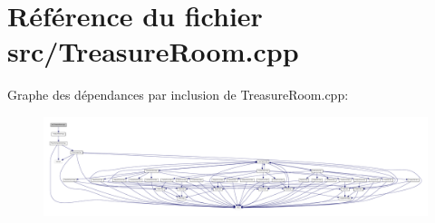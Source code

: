 \section{Référence du fichier src/\-Treasure\-Room.cpp}
\label{_treasure_room_8cpp}
Graphe des dépendances par inclusion de Treasure\-Room.\-cpp\-:\nopagebreak
\begin{figure}[H]
\begin{center}
\leavevmode
\includegraphics[width=350pt]{_treasure_room_8cpp__incl}
\end{center}
\end{figure}
